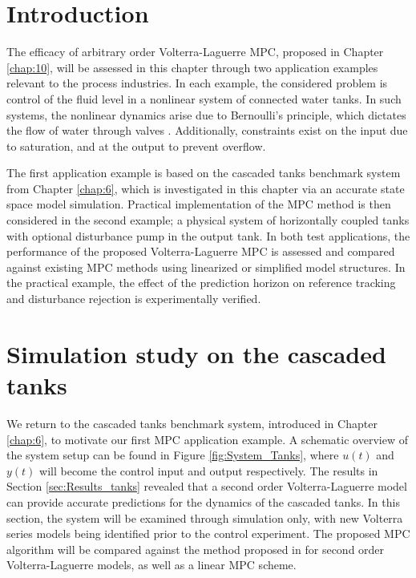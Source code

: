 \section{Introduction}

The efficacy of arbitrary order Volterra-Laguerre MPC, proposed in Chapter \ref{chap:10}, will be assessed in this chapter through two application examples relevant to the process industries. In each example, the considered problem is control of the fluid level in a nonlinear system of connected water tanks. In such systems, the nonlinear dynamics arise due to Bernoulli's principle, which dictates the flow of water through valves \cite{Batchelor2000}. Additionally, constraints exist on the input due to saturation, and at the output to prevent overflow.

The first application example is based on the cascaded tanks benchmark system from Chapter \ref{chap:6}, which is investigated in this chapter via an accurate state space model simulation. Practical implementation of the MPC method is then considered in the second example; a physical system of horizontally coupled tanks with optional disturbance pump in the output tank. In both test applications, the performance of the proposed Volterra-Laguerre MPC is assessed and compared against existing MPC methods using linearized or simplified model structures. In the practical example, the effect of the prediction horizon on reference tracking and disturbance rejection is experimentally verified.

\section{Simulation study on the cascaded tanks}
\label{sec:CascadedTanksMPC}

We return to the cascaded tanks benchmark system, introduced in Chapter \ref{chap:6}, to motivate our first MPC application example. A schematic overview of the system setup can be found in Figure \ref{fig:System_Tanks}, where $u(t)$ and $y(t)$ will become the control input and output respectively. The results in Section \ref{sec:Results_tanks} revealed that a second order Volterra-Laguerre model can provide accurate predictions for the dynamics of the cascaded tanks. In this section, the system will be examined through simulation only, with new Volterra series models being identified prior to the control experiment. The proposed MPC algorithm will be compared against the method proposed in \cite{Parker1998} for second order Volterra-Laguerre models, as well as a linear MPC scheme.

